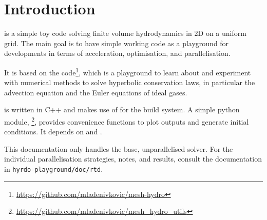\newpage


\section{Introduction}


\hydro is a simple toy code solving finite volume hydrodynamics in 2D on a
uniform grid. The main goal is to have simple working code as a playground for
developments in terms of acceleration, optimisation, and parallelisation.

It is based on the 
code\footnote{\url{https://github.com/mladenivkovic/mesh-hydro}}, which is a
playground to learn about and experiment with numerical methods to solve
hyperbolic conservation laws, in particular the advection equation and the Euler
equations of ideal gases.

\hydro is written in C++ and makes use of  for the build system.
A simple python module, \mhutils\footnote{
\url{https://github.com/mladenivkovic/mesh\_hydro\_utils}}, provides convenience
functions to plot outputs and generate initial conditions. It depends on
 and .

This documentation only handles the base, unparallelised solver. For the
individual parallelisation strategies, notes, and results, consult the
documentation in \verb|hyrdo-playground/doc/rtd|.



